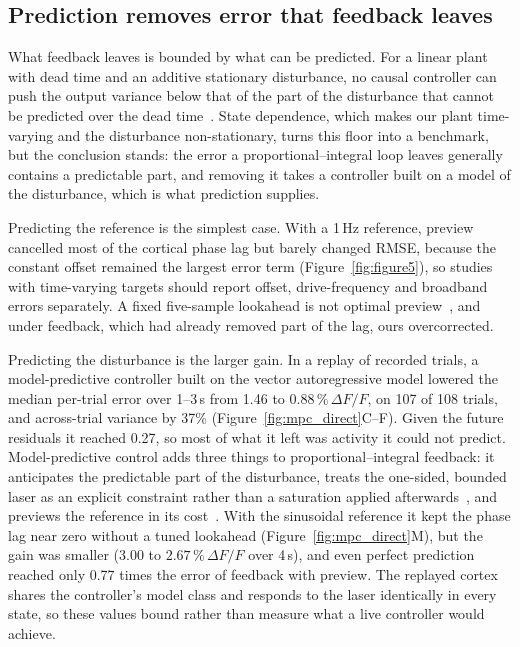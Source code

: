 \subsection*{Prediction removes error that feedback leaves}

What feedback leaves is bounded by what can be predicted. For a linear plant with dead time and an additive stationary disturbance, no causal controller can push the output variance below that of the part of the disturbance that cannot be predicted over the dead time~\citep{astrom1970introduction}. State dependence, which makes our plant time-varying and the disturbance non-stationary, turns this floor into a benchmark, but the conclusion stands: the error a proportional--integral loop leaves generally contains a predictable part, and removing it takes a controller built on a model of the disturbance, which is what prediction supplies.

Predicting the reference is the simplest case. With a 1\,Hz reference, preview cancelled most of the cortical phase lag but barely changed RMSE, because the constant offset remained the largest error term (Figure~\ref{fig:figure5}), so studies with time-varying targets should report offset, drive-frequency and broadband errors separately. A fixed five-sample lookahead is not optimal preview~\citep{tomizuka1975discrete}, and under feedback, which had already removed part of the lag, ours overcorrected.

Predicting the disturbance is the larger gain. In a replay of recorded trials, a model-predictive controller built on the vector autoregressive model lowered the median per-trial error over 1--3\,s from 1.46 to $0.88\,\%\,\Delta F/F$, on 107 of 108 trials, and across-trial variance by 37\% (Figure~\ref{fig:mpc_direct}C--F). Given the future residuals it reached 0.27, so most of what it left was activity it could not predict. Model-predictive control adds three things to proportional--integral feedback: it anticipates the predictable part of the disturbance, treats the one-sided, bounded laser as an explicit constraint rather than a saturation applied afterwards~\citep{mayne2000constrained}, and previews the reference in its cost~\citep{rawlings2017mpc}. With the sinusoidal reference it kept the phase lag near zero without a tuned lookahead (Figure~\ref{fig:mpc_direct}M), but the gain was smaller (3.00 to $2.67\,\%\,\Delta F/F$ over 4\,s), and even perfect prediction reached only 0.77 times the error of feedback with preview. The replayed cortex shares the controller's model class and responds to the laser identically in every state, so these values bound rather than measure what a live controller would achieve.


